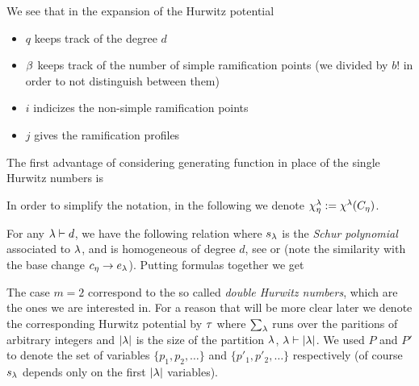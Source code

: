 \documentclass[../main/main.tex]{subfiles}
\begin{document}
We see that in the expansion of the Hurwitz potential
\begin{itemize}
	\item $q$ keeps track of the degree $d$
	\item $\beta$ keeps track of the number of simple ramification points (we divided by $b!$ in order to not distinguish between them)
	\item $i$ indicizes the non-simple ramification points
	\item $j$ gives the ramification profiles
\end{itemize}

The first advantage of considering generating function in place of the single Hurwitz numbers is 

\begin{theorem}[{\cite[Thm. 10.2.1]{CM}}]
\end{theorem}

In order to simplify the notation, in the following we denote $\chi^\lambda_\eta:=\chi^\lambda(C_\eta)$. 

For any $\lambda\vdash d$, we have the following relation 
where $s_\lambda$ is the \emph{Schur polynomial} associated to $\lambda$, and is homogeneous of degree $d$, see \cite[§A, Prop. 4.37, Ex. A.29]{FH} or \cite[Part I]{M} (note the similarity with the base change $c_\eta\to e_\lambda$). Putting formulas together we get

The case $m=2$ correspond to the so called \emph{double Hurwitz numbers}, which are the ones we are interested in. For a reason that will be more clear later we denote the corresponding Hurwitz potential by $\tau$
where $\sum_\lambda$ runs over the paritions of arbitrary integers and $|\lambda|$ is the size of the partition $\lambda$, $\lambda\vdash|\lambda|$. We used $P$ and $P'$ to denote the set of variables $\{p_1,p_2,\ldots\}$ and $\{p'_1,p'_2,\ldots\}$ respectively (of course $s_\lambda$ depends only on the first $|\lambda|$ variables). 
\end{document}
